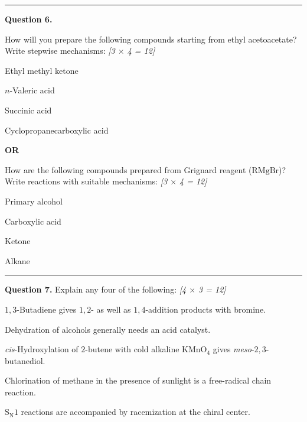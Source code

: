\documentclass[11pt,a4paper]{article}
\newcommand{\pts}[1]{\hfill   \textit{[#1]}}
\begin{document}
\medskip\rule{\linewidth}{0.2pt}




\noindent   \textbf{Question 6.}

\begin{parts}
  \item How will you prepare the following compounds starting from ethyl acetoacetate? Write stepwise mechanisms: \pts{3 $ \times$ 4 = 12}
  
\begin{parts}
    \item Ethyl methyl ketone
    \item $n$-Valeric acid
    \item Succinic acid
    \item Cyclopropanecarboxylic acid
  \end{parts}
\end{parts}
\hfill   \textbf{OR}

\begin{parts}
  \item How are the following compounds prepared from Grignard reagent ($ \text{RMgBr}$)? Write reactions with suitable mechanisms: \pts{3 $ \times$ 4 = 12}
  
\begin{parts}
    \item Primary alcohol
    \item Carboxylic acid
    \item Ketone
    \item Alkane
  \end{parts}
\end{parts}

\medskip\rule{\linewidth}{0.2pt}




\noindent   \textbf{Question 7.} Explain any four of the following: \pts{4 $ \times$ 3 = 12}

\begin{parts}
  \item $1,3$-Butadiene gives $1,2$- as well as $1,4$-addition products with bromine.
  \item Dehydration of alcohols generally needs an acid catalyst.
  \item   \textit{cis}-Hydroxylation of $2$-butene with cold alkaline $ \text{KMnO}_4$ gives   \textit{meso}-$2,3$-butanediol.
  \item Chlorination of methane in the presence of sunlight is a free-radical chain reaction.
  \item $ \text{S}_{ \text{N}}1$ reactions are accompanied by racemization at the chiral center.
\end{parts}
\end{document}
